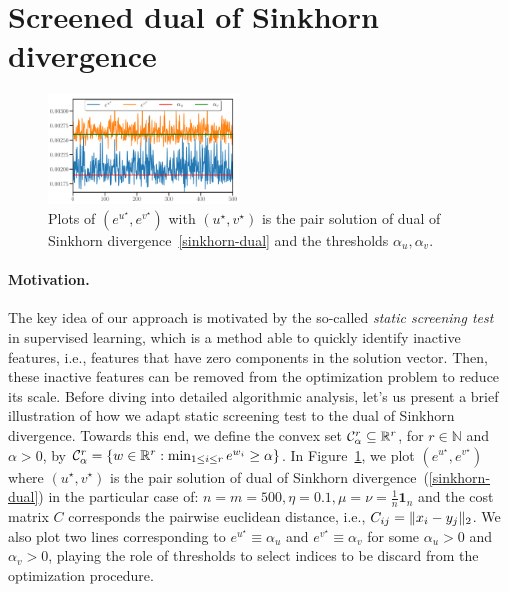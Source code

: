 
\section{Screened dual of Sinkhorn divergence} %
\label{sec:screened_dual_of_sinkhorn_divergence}

\begin{figure}
\vspace{-15pt}
\centering
\includegraphics[width=0.45\textwidth]{./figs/motivations.pdf}
\caption{Plots of $(e^{u^\star}, e^{v^\star})$ with $(u^\star, v^\star)$ is the pair solution of dual of Sinkhorn divergence~\ref{sinkhorn-dual} and the thresholds $\alpha_u, \alpha_v$.}
\label{fig:motivations}
\vspace{-11pt}
\end{figure}

\paragraph{Motivation.} 

The key idea of our approach is motivated by the so-called \emph{static screening test}~\citep{Ghaoui2010SafeFE} in supervised learning, which is a method able to quickly identify inactive features, i.e., features that have zero components in the solution vector. 
Then, these inactive features can be removed from the optimization problem to reduce its scale.
Before diving into detailed algorithmic analysis, let's us present a brief illustration of how we adapt static screening test to the dual of Sinkhorn divergence.
Towards this end, we define the convex set $\mathcal{C}^r_{\alpha} \subseteq {\mathbb{R}}^r$, for $r\in \mathbb N$ and $\alpha >0$, by $\mathcal{C}^r_{\alpha} = \{w\in {\mathbb{R}}^{r}: \min_{1\leq i\leq r} e^{w_i} \geq \alpha\}$.
In Figure~\ref{fig:motivations}, we plot $(e^{u^\star}, e^{v^\star})$ where $(u^\star, v^\star)$ is the pair solution of dual of Sinkhorn divergence~(\ref{sinkhorn-dual}) in the particular case of: $n=m=500, \eta=0.1, \mu = \nu = \frac 1n \mathbf 1_n$ and the cost matrix $C$ corresponds the pairwise euclidean distance, i.e., $C_{ij} = \|x_i - y_j\|_2$. 
We also plot two lines corresponding to $e^{u^\star} \equiv \alpha_u$ and $e^{v^\star} \equiv \alpha_v$ for some $\alpha_u>0$ and $\alpha_v >0$, playing the role of thresholds to select indices to be discard from the optimization procedure.

